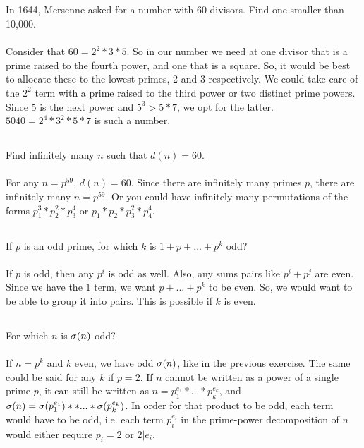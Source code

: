 \documentclass{article}
\begin{document}
\subsection{}
In 1644, Mersenne asked for a number with 60 divisors.
Find one smaller than 10,000.\\~\\
Consider that $60 = 2^2 * 3 * 5$.
So in our number we need at one divisor that is a prime raised to the fourth power,
and one that is a square.
So, it would be best to allocate these to the lowest primes, 2 and 3 respectively.
We could take care of the $2^2$ term with a prime raised to the third power or
two distinct prime powers.
Since 5 is the next power and $5^3 > 5 * 7$, we opt for the latter.
$5040 = 2^4*3^2*5*7$ is such a number.

\subsection{}
Find infinitely many $n$ such that $d(n) = 60$.\\~\\
For any $n = p^{59}$, $d(n) = 60$.
Since there are infinitely many primes $p$, there are infinitely many $n = p^{59}$.
Or you could have infinitely many permutations of the forms $p_1^3*p_2^2*p_3^4$
or $p_1*p_2*p_3^2*p_4^4$.

\subsection{}
If $p$ is an odd prime, for which $k$ is $1 + p + ... + p^k$ odd?\\~\\
If $p$ is odd, then any $p^i$ is odd as well.
Also, any sums pairs like $p^i + p^j$ are even.
Since we have the $1$ term, we want $p + ... + p^k$ to be even.
So, we would want to be able to group it into pairs.
This is possible if $k$ is even.

\subsection{}
For which $n$ is $\sigma(n)$ odd?\\~\\
If $n = p^k$ and $k$ even, we have odd $\sigma(n)$, like in the previous exercise.
The same could be said for any $k$ if $p = 2$.
If $n$ cannot be written as a power of a single prime $p$,
it can still be written as $n = p_1^{e_1}*...*p_k^{e_k}$,
and $\sigma(n) = \sigma(p_1^{e_1})**...*\sigma(p_k^{e_k})$.
In order for that product to be odd, each term would have to be odd, i.e.
each term $p_i^{e_i}$ in the prime-power decomposition of $n$ would either
require $p_i = 2$ or $2|e_i$.
\end{document}
